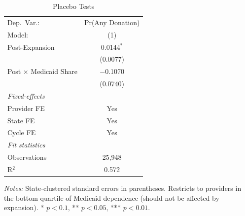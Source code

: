 
\begin{table}[htbp]
   \caption{\label{tab:placebo} Placebo Tests}
   \centering
   \begin{tabular}{lc}
      \tabularnewline \midrule \midrule
      Dep.\ Var.:                                     & Pr(Any Donation)\\
      Model:                                          & (1)\\
      \midrule
      Post-Expansion                                  & 0.0144$^{*}$\\
                                                      & (0.0077)\\
      Post $\times$ Medicaid Share                    & $-$0.1070\\
                                                      & (0.0740)\\
      \midrule
      \emph{Fixed-effects}\\
      Provider FE                                     & Yes\\
      State FE                                        & Yes\\
      Cycle FE                                        & Yes\\
      \midrule
      \emph{Fit statistics}\\
      Observations                                    & 25,948\\
      R$^2$                                           & 0.572\\
      \midrule \midrule
   \end{tabular}

   \par \raggedright \small
   \textit{Notes:} State-clustered standard errors in parentheses.
   Restricts to providers in the bottom quartile of Medicaid dependence (should not be affected by expansion).
   * $p<0.1$, ** $p<0.05$, *** $p<0.01$.
\end{table}


